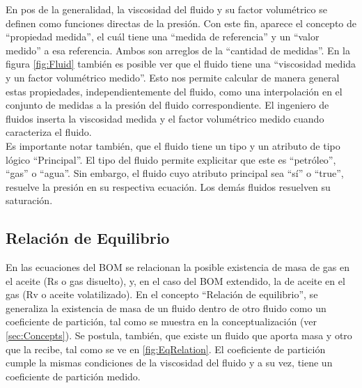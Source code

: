 En pos de la generalidad, la viscosidad del fluido y su factor volumétrico se definen como funciones directas de la presión. Con este fin, aparece el concepto de ``propiedad medida'', el cuál tiene una ``medida de referencia'' y un ``valor medido'' a esa referencia. Ambos son arreglos de la ``cantidad de medidas''. En la figura \ref{fig:Fluid} también es posible ver que el fluido tiene una ``viscosidad medida y un factor volumétrico medido''. Esto nos permite calcular de manera general estas propiedades, independientemente del fluido, como una interpolación en el conjunto de medidas a la presión del fluido correspondiente. El ingeniero de fluidos inserta la viscosidad medida y el factor volumétrico medido cuando caracteriza el fluido. \\

Es importante notar también, que el fluido tiene un tipo y un atributo de tipo lógico ``Principal''. El tipo del fluido permite explicitar que este es ``petróleo'', ``gas'' o ``agua''. Sin embargo, el fluido cuyo atributo principal sea ``sí'' o ``true'', resuelve la presión en su respectiva ecuación. Los demás fluidos resuelven su saturación. 

\subsection{Relación de Equilibrio}\label{sec:PS_Equilibrium}
En las ecuaciones del BOM se relacionan la posible existencia de masa de gas en el aceite (Rs o gas disuelto), y, en el caso del BOM extendido, la de aceite en el gas (Rv o aceite volatilizado). En el concepto ``Relación de equilibrio'', se generaliza la existencia de masa de un fluido dentro de otro fluido como un coeficiente de partición, tal como se muestra en la conceptualización (ver \ref{sec:Concepts}). Se postula, también, que existe un fluido que aporta masa y otro que la recibe, tal como se ve en \ref{fig:EqRelation}. El coeficiente de partición cumple la mismas condiciones de la viscosidad del fluido y a su vez, tiene un coeficiente de partición medido. 

